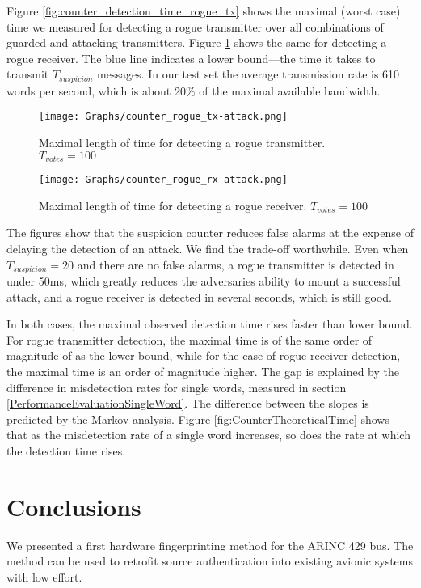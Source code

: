 \documentclass[compsoc,conference,a4paper,10pt,times]{IEEEtran}
\newcommand{\level}[1]{\section{#1}}
\newcommand{\level}[1]{\chapter{#1}}
\begin{document}
  Figure \ref{fig:counter_detection_time_rogue_tx} shows the maximal (worst case) time we measured for detecting a rogue transmitter over all combinations of guarded and attacking transmitters. Figure \ref{fig:counter_detection_time_rogue_rx} shows the same for detecting a rogue receiver. The blue line indicates a lower bound---the time it takes to transmit $T_{suspicion}$ messages. In our test set the average transmission rate is 610 words per second, which is about 20\% of the maximal available bandwidth.
  
  \begin{figure}[t]
    \centering
    \texttt{[image: Graphs/counter\_rogue\_tx-attack.png]}
    \caption{Maximal length of time for detecting a rogue transmitter. $T_{votes} = 100$}
    \label{fig:counter_detection_time_rogue_tx}
  
    \texttt{[image: Graphs/counter\_rogue\_rx-attack.png]}
    \caption{Maximal length of time for detecting a rogue receiver. $T_{votes} = 100$}
    \label{fig:counter_detection_time_rogue_rx}
  \end{figure}
  
  The figures show that the suspicion counter reduces false alarms at the expense of delaying the detection of an attack. We find the trade-off worthwhile. Even when $T_{suspicion} = 20$ and there are no false alarms, a rogue transmitter is detected in under 50ms, which greatly reduces the adversaries ability to mount a successful attack, and a rogue receiver is detected in several seconds, which is still good.
  
  In both cases, the maximal observed detection time rises faster than lower bound. For rogue transmitter detection, the maximal time is of the same order of magnitude of as the lower bound, while for the case of rogue receiver detection, the maximal time is an order of magnitude higher. The gap is explained by the difference in misdetection rates for single words, measured in section \ref{PerformanceEvaluationSingleWord}. The difference between the slopes is predicted by the Markov analysis. Figure \ref{fig:CounterTheoreticalTime} shows that as the misdetection rate of a single word increases, so does the rate at which the detection time rises.
  
\level{Conclusions} \label{Conclusions}
  We presented a first hardware fingerprinting method for the ARINC 429 bus. The method can be used to retrofit source authentication into existing avionic systems with low effort.
  
\end{document}
